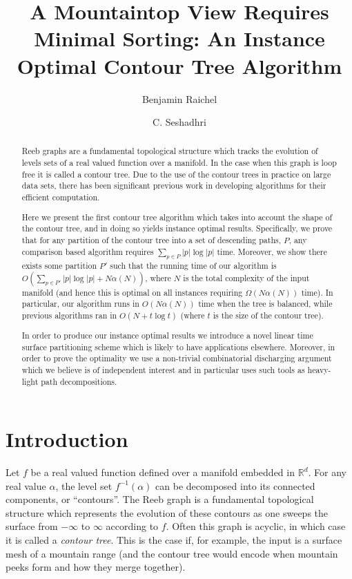 \documentclass[11pt]{article}
\author{
  Benjamin Raichel
  \and
  C. Seshadhri
}
\title{A Mountaintop View Requires Minimal Sorting: \break An Instance Optimal Contour Tree Algorithm}
\date{}
\theoremstyle{definition}
\newcommand{\RR}{\mathbb{R}}
\begin{document}
\maketitle

\begin{abstract}
Reeb graphs are a fundamental topological structure which tracks the evolution of levels sets of a real valued function over a manifold.  
In the case when this graph is loop free it is called a contour tree.  Due to the use of the contour trees in practice on large data sets, 
there has been significant previous work in developing algorithms for their efficient computation. 

Here we present the first contour tree algorithm which takes into account the shape of the contour tree, 
and in doing so yields instance optimal results.
Specifically, we prove that for any partition of the contour tree into a set of descending paths, $P$, 
any comparison based algorithm requires $\sum_{p\in P} |p|\log|p|$ time.  Moreover, we show there   
exists some partition $P'$ such that the running time of our algorithm is 
$O(\sum_{p\in P'} |p|\log|p| + N\alpha(N))$, where $N$ is the total complexity of the input manifold 
(and hence this is optimal on all instances requiring $\Omega(N\alpha(N))$ time).
In particular, our algorithm runs in $O(N\alpha(N))$ time when the tree is balanced, 
while previous algorithms ran in $O(N+t\log t)$ (where $t$ is the size of the contour tree).

In order to produce our instance optimal results we introduce a novel linear time surface partitioning scheme which is likely to have applications elsewhere.
Moreover, in order to prove the optimality we use a non-trivial combinatorial discharging argument which we believe is of independent interest and in particular uses 
such tools as heavy-light path decompositions.
\end{abstract}


\section{Introduction}

Let $f$ be a real valued function defined over a manifold embedded in $\RR^d$.  
For any real value $\alpha$, the level set $f^{-1}(\alpha)$ can be decomposed into its connected components, or ``contours''.
The Reeb graph is a fundamental topological structure which represents the evolution of these contours as one sweeps the surface 
from $-\infty$ to $\infty$ according to $f$.  Often this graph is acyclic, in which case it is 
called a \emph{contour tree}.  This is the case if, for example, the input is a surface mesh of a mountain range 
(and the contour tree would encode when mountain peeks form and how they merge together).
\end{document}
